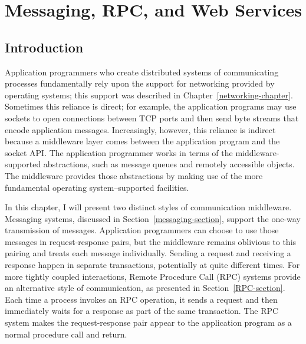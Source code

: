 \chapter{Messaging, RPC, and Web Services}
\label{distmid-chapter}

\section{Introduction}

Application programmers who create distributed systems of
communicating processes fundamentally rely upon the support for
networking provided by operating systems;
this support was described in Chapter~\ref{networking-chapter}.
Sometimes this reliance is direct;
for example, the application programs may use sockets to open
connections between TCP ports and then send byte streams that encode
application messages.  Increasingly, however, this reliance is
indirect because a middleware layer comes
between the application program and the socket API.  The application
programmer works in terms of the middleware-supported abstractions,
such as message queues and remotely accessible objects.  The
middleware provides those abstractions by making use of the more
fundamental operating system--supported facilities.

In this chapter, I will present two distinct styles of communication
middleware.  Messaging systems, discussed in
Section~\ref{messaging-section}, support the one-way transmission of
messages.  Application programmers can choose to use those messages in
request-response pairs, but the middleware remains oblivious to this
pairing and treats each message individually.  Sending a request and
receiving a response happen in separate transactions, potentially at
quite different times.  For more tightly coupled interactions, Remote
Procedure Call (RPC) systems provide an alternative style of
communication, as presented in Section~\ref{RPC-section}.
Each time a process invokes an RPC operation, it sends a request and
then immediately waits for a response as part of the same
transaction.  The RPC system makes the request-response pair appear to
the application program as a normal procedure call and return.

